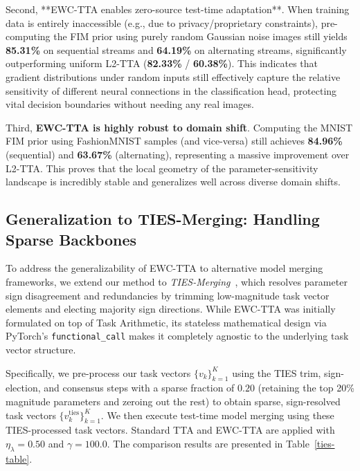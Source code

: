 \documentclass{article}
\theoremstyle{plain}
\theoremstyle{definition}
\theoremstyle{remark}
\begin{document}
Second, **EWC-TTA enables zero-source test-time adaptation**. When training data is entirely inaccessible (e.g., due to privacy/proprietary constraints), pre-computing the FIM prior using purely random Gaussian noise images still yields \textbf{85.31\%} on sequential streams and \textbf{64.19\%} on alternating streams, significantly outperforming uniform L2-TTA (\textbf{82.33\%} / \textbf{60.38\%}). This indicates that gradient distributions under random inputs still effectively capture the relative sensitivity of different neural connections in the classification head, protecting vital decision boundaries without needing any real images.

Third, \textbf{EWC-TTA is highly robust to domain shift}. Computing the MNIST FIM prior using FashionMNIST samples (and vice-versa) still achieves \textbf{84.96\%} (sequential) and \textbf{63.67\%} (alternating), representing a massive improvement over L2-TTA. This proves that the local geometry of the parameter-sensitivity landscape is incredibly stable and generalizes well across diverse domain shifts.

\subsection{Generalization to TIES-Merging: Handling Sparse Backbones}
To address the generalizability of EWC-TTA to alternative model merging frameworks, we extend our method to \textit{TIES-Merging}~\cite{yadav2023resolving}, which resolves parameter sign disagreement and redundancies by trimming low-magnitude task vector elements and electing majority sign directions. While EWC-TTA was initially formulated on top of Task Arithmetic, its stateless mathematical design via PyTorch's \texttt{functional\_call} makes it completely agnostic to the underlying task vector structure.

Specifically, we pre-process our task vectors $\{v_k\}_{k=1}^K$ using the TIES trim, sign-election, and consensus steps with a sparse fraction of $0.20$ (retaining the top 20\% magnitude parameters and zeroing out the rest) to obtain sparse, sign-resolved task vectors $\{v_k^{\text{ties}}\}_{k=1}^K$. We then execute test-time model merging using these TIES-processed task vectors. Standard TTA and EWC-TTA are applied with $\eta_\lambda=0.50$ and $\gamma=100.0$. The comparison results are presented in Table~\ref{ties-table}.
\end{document}
